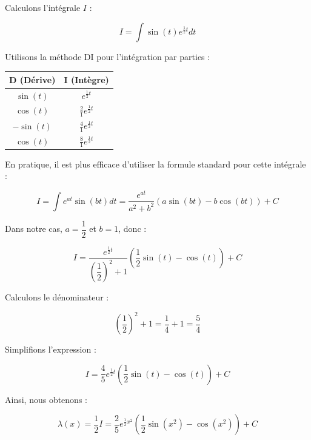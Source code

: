 \documentclass{article}
\begin{document}
Calculons l'intégrale \(I\) :

\begin{equation*}
I = \int \sin(t) e^{ \frac{1}{2} t } dt
\end{equation*}

Utilisons la méthode DI pour l'intégration par parties :

\begin{center}
\begin{tabular}{c|c}
\textbf{D} (Dérive) & \textbf{I} (Intègre) \\
\hline
\(\sin(t)\) & \(e^{ \frac{1}{2} t }\) \\
\(\cos(t)\) & \(\frac{2}{1} e^{ \frac{1}{2} t }\) \\
\(-\sin(t)\) & \(\frac{4}{1} e^{ \frac{1}{2} t }\) \\
\(\cos(t)\) & \(\frac{8}{1} e^{ \frac{1}{2} t }\) \\
\end{tabular}
\end{center}

En pratique, il est plus efficace d'utiliser la formule standard pour cette intégrale :

\begin{equation*}
I = \int e^{ a t } \sin( b t ) dt = \frac{ e^{ a t } }{ a^2 + b^2 } \left( a \sin( b t ) - b \cos( b t ) \right ) + C
\end{equation*}

Dans notre cas, \(a = \dfrac{1}{2}\) et \(b = 1\), donc :

\begin{equation*}
I = \frac{ e^{ \frac{1}{2} t } }{ \left( \dfrac{1}{2} \right)^2 + 1 } \left( \dfrac{1}{2} \sin( t ) - \cos( t ) \right ) + C
\end{equation*}

Calculons le dénominateur :

\begin{equation*}
\left( \dfrac{1}{2} \right)^2 + 1 = \dfrac{1}{4} + 1 = \dfrac{5}{4}
\end{equation*}

Simplifions l'expression :

\begin{equation*}
I = \frac{ 4 }{ 5 } e^{ \frac{1}{2} t } \left( \dfrac{1}{2} \sin( t ) - \cos( t ) \right ) + C
\end{equation*}

Ainsi, nous obtenons :

\begin{equation*}
\lambda(x) = \frac{1}{2} I = \frac{2}{5} e^{ \frac{1}{2} x^2 } \left( \dfrac{1}{2} \sin( x^2 ) - \cos( x^2 ) \right ) + C
\end{equation*}
\end{document}
